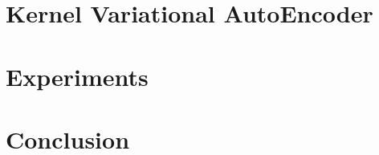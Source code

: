 \documentclass[11pt,a4j]{article}
\begin{document}
  \section{Kernel Variational AutoEncoder}
  \section{Experiments}
  \section{Conclusion}

\end{document}
